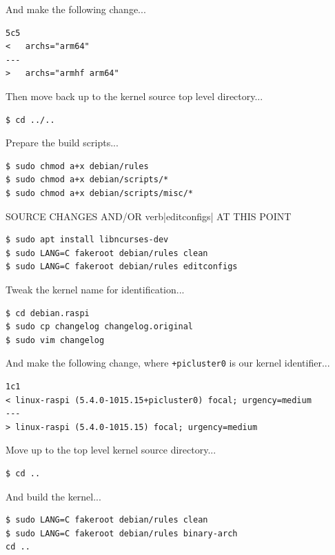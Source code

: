 \documentclass{report}
\begin{document}
And make the following change...

\lstset{style=listingstyle}
\begin{lstlisting}[caption=diff kernelconfig kernelconfig.original, numbers=none]
5c5
< 	archs="arm64"
---
> 	archs="armhf arm64"
\end{lstlisting}

Then move back up to the kernel source top level directory...

\lstset{style=type}
\begin{lstlisting}
$ cd ../..
\end{lstlisting}

Prepare the build scripts...

\lstset{style=type}
\begin{lstlisting}
$ sudo chmod a+x debian/rules
$ sudo chmod a+x debian/scripts/*
$ sudo chmod a+x debian/scripts/misc/*
\end{lstlisting}

SOURCE CHANGES AND/OR verb|editconfigs| AT THIS POINT

\lstset{style=type}
\begin{lstlisting}
$ sudo apt install libncurses-dev
$ sudo LANG=C fakeroot debian/rules clean
$ sudo LANG=C fakeroot debian/rules editconfigs
\end{lstlisting}

Tweak the kernel name for identification...

\lstset{style=type}
\begin{lstlisting}
$ cd debian.raspi
$ sudo cp changelog changelog.original
$ sudo vim changelog
\end{lstlisting}

And make the following change, where \verb|+picluster0| is our kernel identifier...

\lstset{style=listingstyle}
\begin{lstlisting}[caption=diff changelog changelog.original, numbers=none]
1c1
< linux-raspi (5.4.0-1015.15+picluster0) focal; urgency=medium
---
> linux-raspi (5.4.0-1015.15) focal; urgency=medium
\end{lstlisting}

Move up to the top level kernel source directory...

\lstset{style=type}
\begin{lstlisting}
$ cd ..
\end{lstlisting}

And build the kernel...

\lstset{style=type}
\begin{lstlisting}
$ sudo LANG=C fakeroot debian/rules clean
$ sudo LANG=C fakeroot debian/rules binary-arch
cd ..
\end{lstlisting}
\end{document}
